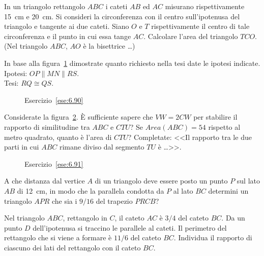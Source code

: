 \begin{multicols}{2}
\begin{esercizio}
\label{ese:6.89}
In un triangolo rettangolo $ABC$ i cateti $AB$ ed $AC$ misurano rispettivamente 15~cm e 20~cm. Si consideri la circonferenza con il centro sull'ipotenusa del triangolo e tangente ai due cateti. Siano $O$ e $T$ rispettivamente il centro di tale circonferenza e il punto in cui essa tange $AC$. Calcolare l'area del triangolo $TCO$. (Nel triangolo $ABC$, $AO$ è la bisettrice \ldots)
\end{esercizio}

\begin{esercizio}
\label{ese:6.90}
In base alla figura~\ref{fig:ese6.90} dimostrate quanto richiesto nella tesi date le ipotesi indicate.\\
Ipotesi: $OP\parallel MN\parallel RS$.\\
Tesi: $RQ\cong QS$.
\end{esercizio}

\begin{figure}[!htb]
	\centering
	\caption{Esercizio~\ref{ese:6.90}}\label{fig:ese6.90}
\end{figure}

\begin{esercizio}
\label{ese:6.91}
Considerate la figura~\ref{fig:ese6.91}. \`E sufficiente sapere che $VW=2CW$ per stabilire il rapporto di similitudine tra $ABC$ e $CTU$? Se $Area(ABC) = 54$ rispetto al metro quadrato, quanto è l'area di $CTU$? Completate: <<Il rapporto tra le due parti in cui $ABC$ rimane diviso dal segmento $TU$ è \ldots{}>>.
\end{esercizio}

\begin{figure}[!htb]
	\centering
	\caption{Esercizio~\ref{ese:6.91}}\label{fig:ese6.91}
\end{figure}

\begin{esercizio}
\label{ese:6.92}
A che distanza dal vertice $A$ di un triangolo deve essere posto un punto $P$ sul lato $AB$ di 12~cm, in modo che la parallela condotta da $P$ al lato $BC$ determini un triangolo $APR$ che sia i $9/16$ del trapezio $PRCB$?
\end{esercizio}

\begin{esercizio}
\label{ese:6.93}
Nel triangolo $ABC$, rettangolo in $C$, il cateto $AC$ è $3/4$ del cateto $BC$. Da un punto $D$ dell'ipotenusa si traccino le parallele al cateti. Il perimetro del rettangolo che si viene a formare è $11/6$ del cateto $BC$. Individua il rapporto di ciascuno dei lati del rettangolo con il cateto $BC$.
\end{esercizio}


\end{multicols}
